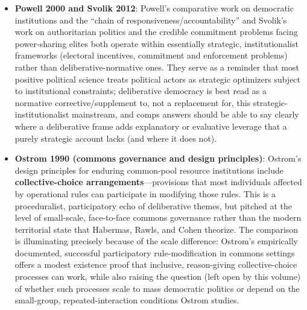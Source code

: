 \documentclass[12pt]{article}
\begin{document}
\begin{itemize}[leftmargin=*, itemsep=4pt]
    \item \textbf{Powell 2000 and Svolik 2012}: Powell's comparative work on democratic institutions and the ``chain of responsiveness/accountability'' and Svolik's work on authoritarian politics and the credible commitment problems facing power-sharing elites both operate within essentially strategic, institutionalist frameworks (electoral incentives, commitment and enforcement problems) rather than deliberative-normative ones. They serve as a reminder that most positive political science treats political actors as strategic optimizers subject to institutional constraints; deliberative democracy is best read as a normative corrective/supplement to, not a replacement for, this strategic-institutionalist mainstream, and comps answers should be able to say clearly where a deliberative frame adds explanatory or evaluative leverage that a purely strategic account lacks (and where it does not).
    \item \textbf{Ostrom 1990 (commons governance and design principles)}: Ostrom's design principles for enduring common-pool resource institutions include \textbf{collective-choice arrangements}---provisions that most individuals affected by operational rules can participate in modifying those rules. This is a proceduralist, participatory echo of deliberative themes, but pitched at the level of small-scale, face-to-face commons governance rather than the modern territorial state that Habermas, Rawls, and Cohen theorize. The comparison is illuminating precisely because of the scale difference: Ostrom's empirically documented, successful participatory rule-modification in commons settings offers a modest existence proof that inclusive, reason-giving collective-choice processes can work, while also raising the question (left open by this volume) of whether such processes scale to mass democratic politics or depend on the small-group, repeated-interaction conditions Ostrom studies.
\end{itemize}
\end{document}
